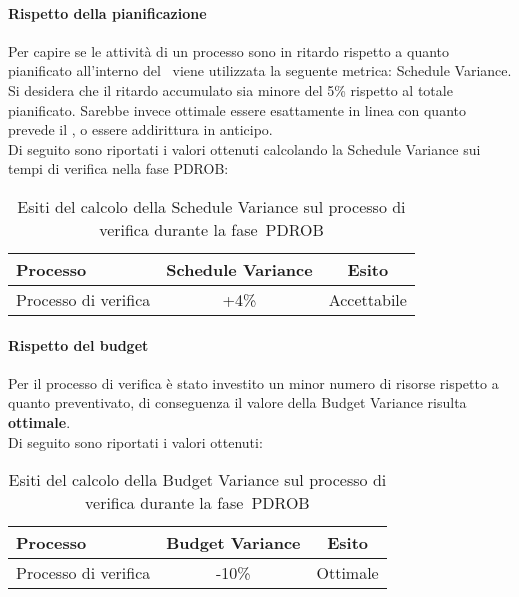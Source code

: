 \documentclass[../PianoDiQualifica.tex]{subfiles}
\begin{document}
\begin{appendices}
			\paragraph{Rispetto della pianificazione}
			Per capire se le attività di un processo sono in ritardo rispetto a quanto pianificato all'interno del \pianodiprogetto\ viene utilizzata la seguente metrica: Schedule Variance.\\
			Si desidera che il ritardo accumulato sia minore del 5\% rispetto al totale pianificato. Sarebbe invece ottimale essere esattamente in linea con quanto prevede il \pianodiprogetto, o essere addirittura in anticipo.\\
			Di seguito sono riportati i valori ottenuti calcolando la Schedule Variance sui tempi di verifica nella fase PDROB:
			\begin{table}[H]
				\centering
				\begin{tabular}{l * {2}{c}}
					\toprule
					\textbf{Processo} & \textbf{Schedule Variance} & \textbf{Esito} \\
					\midrule
					Processo di verifica & +4\% &  Accettabile \\
					\bottomrule
				\end{tabular}
				\caption{Esiti del calcolo della Schedule Variance sul processo di verifica durante la fase\g\ PDROB}
				\label{tab:esiti_schedule_variance}
			\end{table}
			
			\paragraph{Rispetto del budget}
			Per il processo di verifica è stato investito un minor numero di risorse rispetto a quanto preventivato, di conseguenza il valore della Budget Variance risulta \textbf{ottimale}.\\
			Di seguito sono riportati i valori ottenuti:
			\begin{table}[H]
				\centering
				\begin{tabular}{l * {2}{c}}
					\toprule
					\textbf{Processo} & \textbf{Budget Variance} & \textbf{Esito} \\
					\midrule
					Processo di verifica & -10\% &  Ottimale \\
					\bottomrule
				\end{tabular}
				\caption{Esiti del calcolo della Budget Variance sul processo di verifica durante la fase\g\ PDROB}
				\label{tab:esiti_budget_variance}
			\end{table}
			

\end{appendices}
\end{document}
